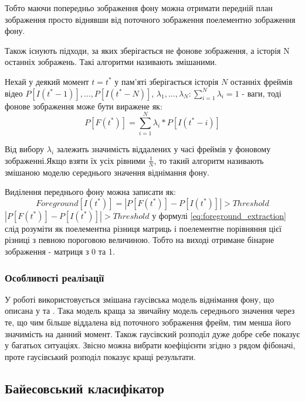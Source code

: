 Тобто маючи попередньо зображення фону можна отримати передній план зображення просто віднявши від поточного зображення поелементно зображення фону.

Також існують підходи, за яких зберігається не фонове зображення, а історія N останніх зображень. Такі алгоритми називають змішаними.

Нехай у деякий момент $t = t^{*}$ у пам'яті зберігається історія $N$ останніх фреймів відео $P[I(t^{*} - 1)], ... , P[I(t^{*} - N)]$, $\lambda_{1}, ... , \lambda_{N} : \sum_{i = 1}^{N} \lambda_{i} = 1$ - ваги, тоді фонове зображення може бути виражене як:
\begin{equation}
	P[F(t^{*})] = \sum_{ i = 1}^{N} \lambda_{i} * P[I(t^{*} - i)]
	\label{eq:background_approximation}
\end{equation}

Від вибору $\lambda_{i}$ залежить значимість віддалених у часі фреймів у фоновому зображенні.Якщо взяти їх усіх рівними $\frac{1}{N}$, то такий алгоритм називають змішаною моделю середнього значення віднімання фону. 

Виділення переднього фону можна записати як:
\begin{equation}
Foreground[I(t^{*})] = | P[F(t^{*})] - P[I(t^{*})] | > Threshold
\label{eq:foreground_extraction}
\end{equation}
$| P[F(t^{*})] - P[I(t^{*})] | > Threshold$ у формулі \ref{eq:foreground_extraction} слід розуміти як поелементна різниця матриць і поелементне порівняння цієї різниці з певною пороговою величиною. Тобто на виході отримане бінарне зображення - матриця з 0 та 1.

\subsubsection{Особливості реалізації}

У роботі використовується змішана гаусівська модель віднімання фону, що описана у \cite{MOG1} та \cite{MOG2}. Така модель краща за звичайну модель середнього значення через те, що чим більше віддалена від поточного зображення фрейм, тим менша його значимість на данний момент. Також гаусівский розподіл дуже добре себе показує у багатьох ситуаціях. Звісно можна вибрати коефіцієнти згідно з рядом фібоначі, проте гаусівський розподіл показує кращі результати.

\subsection{Байесовський класифікатор}
\jointitles
